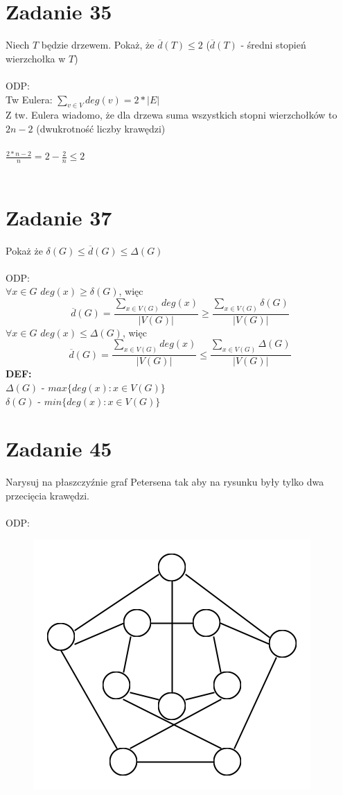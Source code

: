 \documentclass{article}
\begin{document}
\section{\centering Zadanie 35}
Niech $T$ będzie drzewem. Pokaż, że $\overline{d}(T) \leq 2$ ($\overline{d}(T)$ - średni stopień wierzchołka w $T$)\\\\
ODP:\\
Tw Eulera: $\sum_{v \in V}deg(v) = 2 * |E|$ \\
Z tw. Eulera wiadomo, że dla drzewa suma wszystkich stopni wierzchołków to $2n-2$ (dwukrotność liczby krawędzi)\\\\
$\frac{2*n-2}{n} = 2 - \frac{2}{n} \leq 2$\\\\
\section{\centering Zadanie 37}
Pokaż że $\delta(G) \leq \overline{d}(G) \leq \Delta(G)$ \\\\
ODP: \\
$\forall x \in G$ $deg(x) \geq \delta(G)$, więc
$$\overline{d}(G) = \frac{\sum_{x \in V(G)}deg(x)}{|V(G)|} \geq \frac{\sum_{x \in V(G)}\delta(G)}{|V(G)|}$$
$\forall x \in G$ $deg(x) \leq \Delta(G)$, więc
$$\overline{d}(G) = \frac{\sum_{x \in V(G)}deg(x)}{|V(G)|} \leq \frac{\sum_{x \in V(G)}\Delta(G)}{|V(G)|}$$
\noindent \textbf{DEF:} \\
$\Delta(G)$ - $max\{deg(x) : x \in V(G)\}$\\
$\delta(G)$ - $min\{deg(x) : x \in V(G)\}$
\section{\centering Zadanie 45}
Narysuj na płaszczyźnie graf Petersena tak aby na rysunku były tylko dwa przecięcia krawędzi. \\\\
ODP: \\
\begin{figure}[H]
	\centering
	\includegraphics[width=0.3\linewidth]{z45.png}  
\end{figure}
\end{document}
